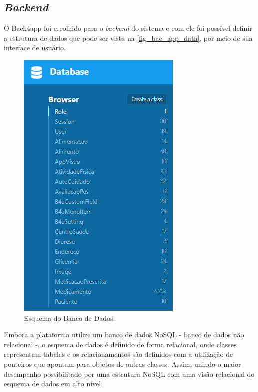 \subsection{\emph{Backend}}

O Back4app foi escolhido para o \emph{backend} do sistema e com ele foi possível definir a estrutura de dados que pode
ser vista na \autoref{fig_bac_app_data}, por meio de sua interface de usuário.

\begin{figure}[htb]
    \caption{\label{fig_bac_app_data}Esquema do Banco de Dados.}
    \begin{center}
        \includegraphics[scale=1.1]{Imagens/desenvolvimento/back4app_database.png}
    \end{center}
\end{figure}

Embora a plataforma utilize um banco de dados NoSQL - banco de dados não relacional -, o esquema de dados
é definido de forma relacional, onde classes representam tabelas e os relacionamentos são definidos com a utilização
de ponteiros que apontam para objetos de outras classes. Assim, unindo o maior desempenho possibilitado por uma
estrutura NoSQL com uma visão relacional do esquema de dados em alto nível.

\newpage

